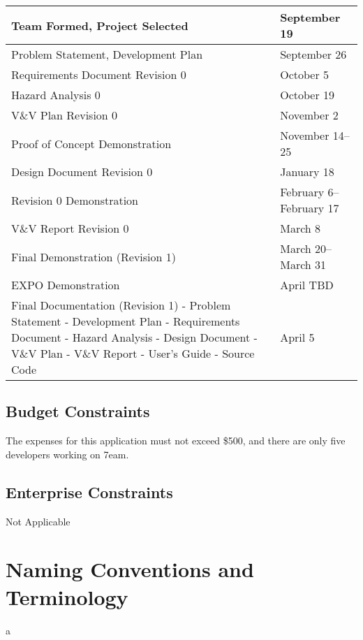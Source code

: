 \documentclass[12pt]{article}
\begin{document}
\begin{tabular}{ |p{9.7cm} l|}
	\hline
	Team Formed, Project Selected & September 19\\
	\hline
	Problem Statement, Development Plan & September 26\\
	\hline
	Requirements Document Revision 0 & October 5\\
	\hline
	Hazard Analysis 0 & October 19\\
	\hline
	V\&V Plan Revision 0 & November 2\\
	\hline
	Proof of Concept Demonstration & November 14--25\\
	\hline
	Design Document Revision 0 & January 18\\
	\hline
	Revision 0 Demonstration & February 6--February 17\\
	\hline
	V\&V Report Revision 0 & March 8\\
	\hline
	Final Demonstration (Revision 1) & March 20--March 31\\
	\hline
	EXPO Demonstration & April TBD\\
	\hline
	Final Documentation (Revision 1)\newline 
	- Problem Statement\newline
	- Development Plan\newline
	- Requirements Document\newline
	- Hazard Analysis\newline
	- Design Document\newline
	- V\&V Plan\newline
	- V\&V Report\newline
	- User's Guide\newline
	- Source Code\newline & April 5\\
	\hline
\end{tabular}

\subsection{Budget Constraints}
The expenses for this application must not exceed \$500, and there are only five developers working on 7eam.

\subsection{Enterprise Constraints}
Not Applicable

\section{Naming Conventions and Terminology}
a
\end{document}
